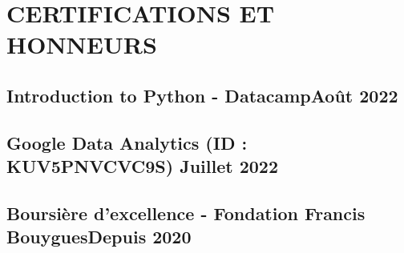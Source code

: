 \documentclass[letter,11pt]{article}
\begin{document}
\vspace{-3pt}
\section{CERTIFICATIONS ET HONNEURS}


\subsection{{Introduction to Python - Datacamp\hfill  Août 2022 }}

\vspace{2pt}
\subsection{{Google Data Analytics (ID : KUV5PNVCVC9S) \hfill  Juillet 2022 }}

\vspace{2pt}
\subsection{{Boursière d'excellence - Fondation Francis Bouygues\hfill  Depuis 2020 }}
\end{document}
